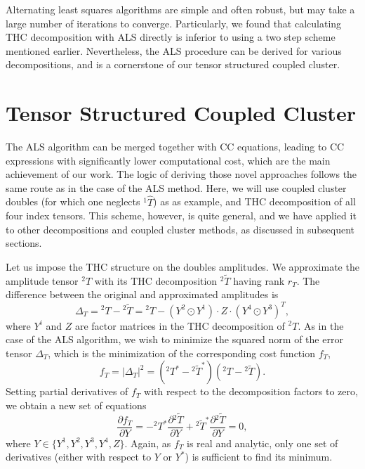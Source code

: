 Alternating least squares algorithms are simple and 
often robust,\cite{uschmajew2012local} but may take a large number of
iterations to converge.\cite{comon2009tensor} Particularly, we found that 
calculating THC decomposition with ALS directly is inferior to using a two 
step scheme mentioned earlier.\cite{schutski2017tensor} Nevertheless, the ALS 
procedure can be derived for various decompositions, and is a cornerstone of 
our tensor structured coupled cluster.

\section{Tensor Structured Coupled Cluster}
The ALS algorithm can be merged together with CC equations, leading to
CC expressions with significantly lower computational cost, which are the main 
achievement of our work.\cite{schutski2017tensor} The logic of deriving those 
novel approaches follows the same route as in the case of the ALS method. Here, 
we will use coupled cluster doubles (for which one neglects ${}^1\hat{T}$) as as 
example, and THC decomposition of all four index tensors. This scheme, 
however, is quite general, and we have applied it to other decompositions and 
coupled cluster methods, as discussed in subsequent sections. 

Let us impose the THC structure on the doubles amplitudes. We
approximate the amplitude tensor ${}^{2}T$ with its THC decomposition
${}^{2}\tilde{T}$ having rank $r_{T}$.  The difference between the original and 
approximated amplitudes is
%
\begin{equation} 
\Delta_{T} = {}^{2}T - {}^{2}\tilde{T} = {}^{2}T -
(Y^{2} \odot Y^{1}) \cdot Z \cdot (Y^{4} \odot Y^{3})^{T},
\end{equation}
%
where $Y^{i}$ and $Z$ are factor matrices in the THC
decomposition of ${}^{2}T$. As in the case of the ALS algorithm, we wish to 
minimize the squared norm of the error tensor $\Delta_{T}$, which is the 
minimization of 
the corresponding cost function $f_{T}$,
%
\begin{equation}
f_{T} = |\Delta_{T}|^2 = ({}^{2}T^{\ast} -
{}^{2}\tilde{T}^{\ast})({}^{2}T - {}^{2}\tilde{T}).
\end{equation}
%
Setting partial derivatives of $f_{T}$ with respect to
the decomposition factors to zero, we obtain a new set of equations
%
\begin{equation} 
\frac{\partial f_{T}}{\partial Y} = - {}^{2}T^{\ast}
\frac{\partial {}^{2} \tilde{T}}{\partial Y} + {}^{2}\tilde{T}^{\ast}
\frac{\partial {}^{2} \tilde{T}}{\partial Y} = 0,
\label{eq:cc_cost_function}
\end{equation}
%
where $Y \in \{Y^{1}, Y^{2}, Y^{3}, Y^{4}, Z\}$. Again,
as $f_{T}$ is real and analytic, only one set of derivatives (either
with respect to $Y$ or $Y^{\ast}$) is sufficient to find its minimum.

